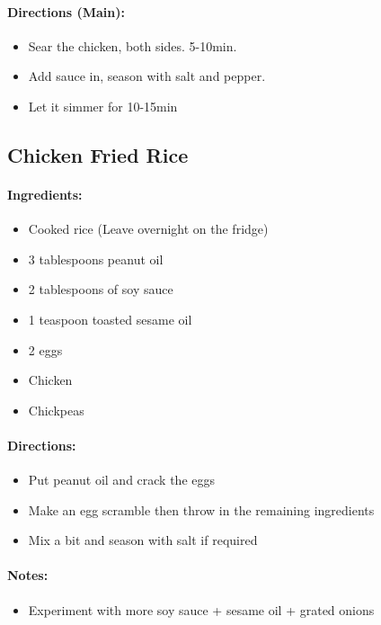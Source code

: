 \documentclass{article}
\begin{document}
\paragraph{Directions (Main):}
\begin{itemize}
    \item Sear the chicken, both sides. 5-10min.
    \item Add sauce in, season with salt and pepper.
    \item Let it simmer for 10-15min
\end{itemize} 

\subsection{Chicken Fried Rice}

\paragraph{Ingredients:}
\begin{itemize}
    \item Cooked rice (Leave overnight on the fridge)
    \item 3 tablespoons peanut oil
    \item 2 tablespoons of soy sauce
    \item 1 teaspoon toasted sesame oil
    \item 2 eggs
    \item Chicken
    \item Chickpeas
\end{itemize}

\paragraph{Directions:}
\begin{itemize}
    \item Put peanut oil and crack the eggs
    \item Make an egg scramble then throw in the remaining ingredients
    \item Mix a bit and season with salt if required
\end{itemize}

\paragraph{Notes:}
\begin{itemize}
    \item Experiment with more soy sauce + sesame oil + grated onions
\end{itemize}
\end{document}
